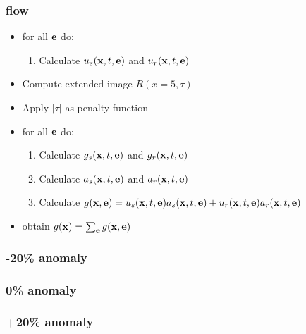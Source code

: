 \begin{frame} \frametitle{flow}

    \begin{itemize}
        \item for all $\bf e$ do:
        \begin{enumerate}
            \item Calculate $ u_s({\bf x},t,{\bf e})$ and  $ u_r({\bf x},t,{\bf e})$
        \end{enumerate}
    \end{itemize}

    \begin{itemize}
        \item Compute extended image $R(x=5,\tau)$
        \item Apply $|\tau|$ as penalty function
        \item for all $\bf e$ do:
        \begin{enumerate}
            \item Calculate  $ g_s({\bf x},t,{\bf e})$ and  $ g_r({\bf x},t,{\bf e})$
            \item Calculate $ a_s({\bf x},t,{\bf e})$ and  $a_r({\bf x},t,{\bf e})$
            \item Calculate $g({\bf x},{\bf e})=   u_s({\bf x},t,{\bf e})a_s({\bf x},t,{\bf e}) + u_r({\bf x},t,{\bf e})a_r({\bf x},t,{\bf e})$
        \end{enumerate}
        \item obtain $g({\bf x})=\sum_{{\bf e}} g({\bf x},{\bf e}) $
    \end{itemize}

\end{frame}




\begin{frame}\frametitle{-20\% anomaly}
\end{frame}

\begin{frame}\frametitle{0\% anomaly} 
\end{frame}
\begin{frame}\frametitle{+20\% anomaly} 
\end{frame}

